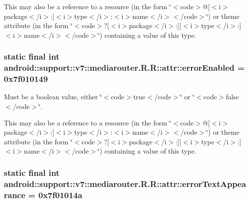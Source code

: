 This may also be a reference to a resource (in the form \char`\"{}$<$code$>$@\mbox{[}$<$i$>$package$<$/i$>$:\mbox{]}$<$i$>$type$<$/i$>$:$<$i$>$name$<$/i$>$$<$/code$>$\char`\"{}) or theme attribute (in the form \char`\"{}$<$code$>$?\mbox{[}$<$i$>$package$<$/i$>$:\mbox{]}\mbox{[}$<$i$>$type$<$/i$>$:\mbox{]}$<$i$>$name$<$/i$>$$<$/code$>$\char`\"{}) containing a value of this type. \hypertarget{classandroid_1_1support_1_1v7_1_1mediarouter_1_1_r_1_1attr_4020d0a011a9661363697e649b927f51}{
\subsubsection[{errorEnabled}]{\setlength{\rightskip}{0pt plus 5cm}static final int android::support::v7::mediarouter.R.R::attr::errorEnabled = 0x7f010149}}
\label{classandroid_1_1support_1_1v7_1_1mediarouter_1_1_r_1_1attr_4020d0a011a9661363697e649b927f51}


Must be a boolean value, either \char`\"{}$<$code$>$true$<$/code$>$\char`\"{} or \char`\"{}$<$code$>$false$<$/code$>$\char`\"{}. 

This may also be a reference to a resource (in the form \char`\"{}$<$code$>$@\mbox{[}$<$i$>$package$<$/i$>$:\mbox{]}$<$i$>$type$<$/i$>$:$<$i$>$name$<$/i$>$$<$/code$>$\char`\"{}) or theme attribute (in the form \char`\"{}$<$code$>$?\mbox{[}$<$i$>$package$<$/i$>$:\mbox{]}\mbox{[}$<$i$>$type$<$/i$>$:\mbox{]}$<$i$>$name$<$/i$>$$<$/code$>$\char`\"{}) containing a value of this type. \hypertarget{classandroid_1_1support_1_1v7_1_1mediarouter_1_1_r_1_1attr_6b3b30af8f9da0b201efcb784e32a8d2}{
\subsubsection[{errorTextAppearance}]{\setlength{\rightskip}{0pt plus 5cm}static final int android::support::v7::mediarouter.R.R::attr::errorTextAppearance = 0x7f01014a}}
\label{classandroid_1_1support_1_1v7_1_1mediarouter_1_1_r_1_1attr_6b3b30af8f9da0b201efcb784e32a8d2}


